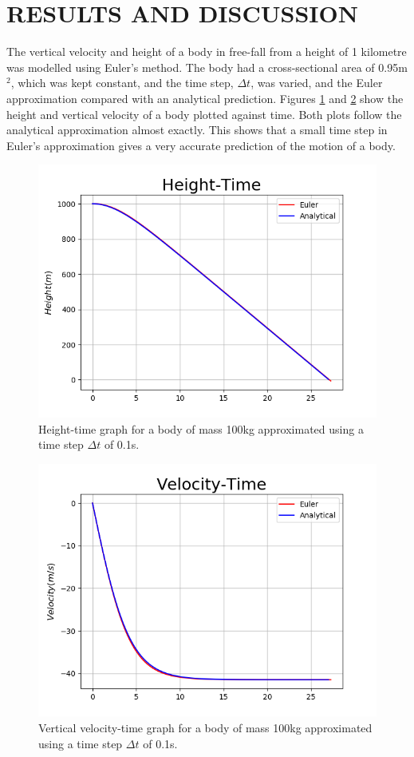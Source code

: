 \documentclass[twocolumn,prl,nobalancelastpage,aps,10pt]{revtex4-1}
\begin{document}
\section{RESULTS AND DISCUSSION}

The vertical velocity and height of a body in free-fall from a height of 1 kilometre was modelled using Euler's method. The body had a cross-sectional area of 0.95m$^{2}$, which was kept constant, and the time step, $\Delta t$, was varied, and the Euler approximation compared with an analytical prediction. Figures \ref{ana-fig-ht-t=0.25} and \ref{ana-fig-vt-t=0.25} show the height and vertical velocity of a body plotted against time. Both plots follow the analytical approximation almost exactly. This shows that a small time step in Euler's approximation gives a very accurate prediction of the motion of a body.
\begin{figure}
	\includegraphics*[width=0.96\linewidth,clip]{ana-fig-ht-t=025}
	\caption{Height-time graph for a body of mass 100kg approximated using a time step $\Delta t$ of  0.1s.}\label{ana-fig-ht-t=0.25}
\end{figure}
\begin{figure}
	\includegraphics*[width=0.96\linewidth,clip]{ana-fig-vt-t=025}
	\caption{Vertical velocity-time graph for a body of mass 100kg approximated using a time step $\Delta t$ of  0.1s.}\label{ana-fig-vt-t=0.25}
\end{figure}
\end{document}
